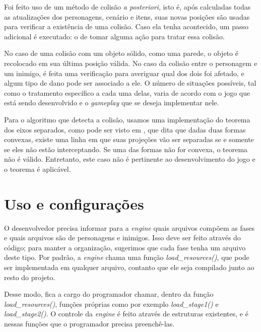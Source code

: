 \documentclass[brazil]{abnt}
\begin{document}
Foi feito uso de um método de colisão \textit{a posteriori}, isto é, após calculadas todas as atualizações dos personagens, cenário e itens, suas novas posições são usadas para verificar a existência de uma colisão. Caso ela tenha acontecido, um passo adicional é executado: o de tomar alguma ação para tratar essa colisão.

No caso de uma colisão com um objeto sólido, como uma parede,  o objeto é recolocado em sua última posição válida. No caso da colisão entre o personagem e um inimigo, é feita uma verificação para averiguar qual dos dois foi afetado, e algum tipo de dano pode ser associado a ele. O número de situações possíveis, tal como o tratamento específico a cada uma delas, varia de acordo com o jogo que está sendo desenvolvido e o \textit{gameplay} que se deseja implementar nele.

Para o algoritmo que detecta a colisão, usamos uma implementação do teorema dos eixos separados, como pode ser visto em \cite{SeparatingAxes}, que dita que dadas duas formas convexas, existe uma linha em que suas projeções vão ser separadas se e somente se eles não estão interceptando. Se uma das formas não for convexa, o teorema não é válido. Entretanto, este caso não é pertinente ao desenvolvimento do jogo e o teorema é aplicável.

\section{Uso e configurações}

O desenvolvedor precisa informar para a \textit{engine} quais arquivos compõem as fases e quais arquivos são de personagens e inimigos. Isso deve ser feito através do código; para manter a organização, sugerimos que cada fase tenha um arquivo deste tipo. Por padrão, a \textit{engine} chama uma função \textit{load\_resources()}, que pode ser implementada em qualquer arquivo, contanto que ele seja compilado junto ao resto do projeto.

Desse modo, fica a cargo do programador chamar, dentro da função \textit{load\_resources()}, funções próprias como por exemplo \textit{load\_stage1()} e \textit{load\_stage2()}. O controle da \textit{engine} é feito através de estruturas existentes, e é nessas funções que o programador precisa preenchê-las.



\end{document}
